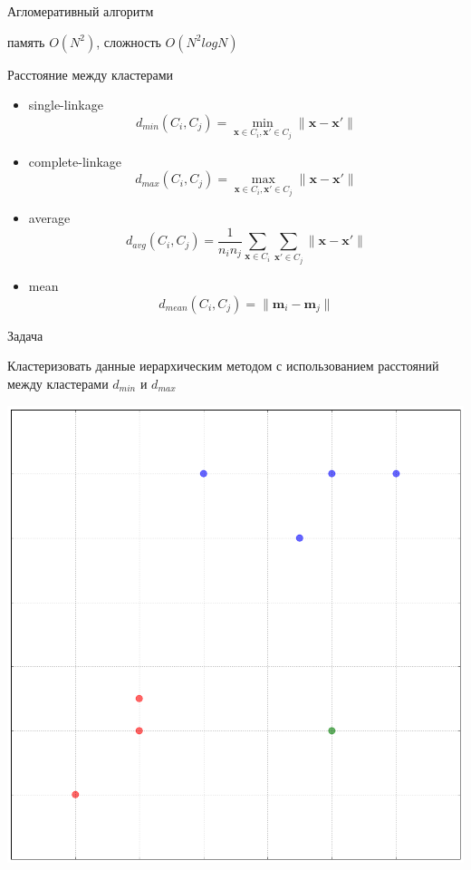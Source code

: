 \documentclass[aspectratio=169]{beamer}
\begin{document}
\begin{frame}{Агломеративный алгоритм}

\begin{small}
\hier
\end{small}
память $O(N^2)$, сложность $O(N^2 log N)$

\end{frame}

\begin{frame}{Расстояние между кластерами}

\begin{itemize}
\item single-linkage
\[
d_{min}(C_i, C_j) = \min_{\mathbf{x} \in C_i, \mathbf{x}' \in C_j} \|\mathbf{x} -\mathbf{x}' \|
\]
\item complete-linkage
\[
d_{max}(C_i, C_j) = \max_{\mathbf{x} \in C_i, \mathbf{x}' \in C_j} \|\mathbf{x} -\mathbf{x}' \|
\]
\item average
\[
d_{avg}(C_i, C_j) = \frac{1}{n_i n_j}\sum_{\mathbf{x} \in C_i}\sum_{\mathbf{x}' \in C_j} \|\mathbf{x} -\mathbf{x}' \|
\]
\item mean
\[
d_{mean}(C_i, C_j) = \|\mathbf{m}_i -\mathbf{m}_j \|
\]
\end{itemize}

\end{frame}

\begin{frame}{Задача}

Кластеризовать данные иерархическим методом с использованием расстояний между кластерами $d_{min}$ и $d_{max}$
\begin{center}
\includegraphics[height=0.7\textheight]{images/toy.png}
\end{center}

\end{frame}
\end{document}
